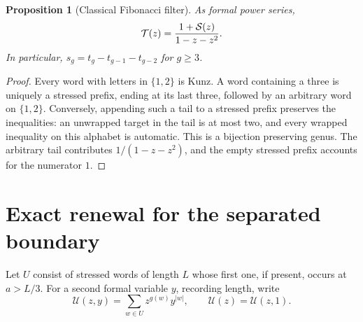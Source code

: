\documentclass[11pt,letterpaper]{article}
\newtheorem{proposition}[theorem]{Proposition}
\theoremstyle{definition}
\newcommand{\cS}{\mathcal S}\newcommand{\cU}{\mathcal U}
\begin{document}
\begin{proposition}[Classical Fibonacci filter]\label{ska:prop:filter}
As formal power series,
\begin{equation}\label{ska:eq:filter}
\cT(z)=\frac{1+\cS(z)}{1-z-z^2}.
\end{equation}
In particular, $s_g=t_g-t_{g-1}-t_{g-2}$ for $g\ge3$.
\end{proposition}
\begin{proof}
Every word with letters in $\{1,2\}$ is Kunz. A word containing a three is uniquely a stressed prefix, ending at its last three, followed by an arbitrary word on $\{1,2\}$. Conversely, appending such a tail to a stressed prefix preserves the inequalities: an unwrapped target in the tail is at most two, and every wrapped inequality on this alphabet is automatic. This is a bijection preserving genus. The arbitrary tail contributes $1/(1-z-z^2)$, and the empty stressed prefix accounts for the numerator $1$.
\end{proof}

\section{Exact renewal for the separated boundary}\label{ska:sec:renewal}
Let $U$ consist of stressed words of length $L$ whose first one, if present, occurs at $a>L/3$. For a second formal variable $y$, recording length, write
\[
\cU(z,y)=\sum_{w\in U}z^{g(w)}y^{|w|},\qquad \cU(z)=\cU(z,1).
\]
\end{document}
